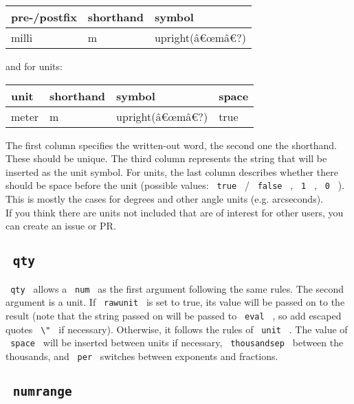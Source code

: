 \begin{longtable}[]{@{}lll@{}}
\toprule\noalign{}
pre-/postfix & shorthand & symbol \\
\midrule\noalign{}
\endhead
\bottomrule\noalign{}
\endlastfoot
milli & m & upright(â€œmâ€?) \\
\end{longtable}

and for units:

\begin{longtable}[]{@{}llll@{}}
\toprule\noalign{}
unit & shorthand & symbol & space \\
\midrule\noalign{}
\endhead
\bottomrule\noalign{}
\endlastfoot
meter & m & upright(â€œmâ€?) & true \\
\end{longtable}

The first column specifies the written-out word, the second one the
shorthand. These should be unique. The third column represents the
string that will be inserted as the unit symbol. For units, the last
column describes whether there should be space before the unit (possible
values: \texttt{\ true\ } / \texttt{\ false\ } , \texttt{\ 1\ } ,
\texttt{\ 0\ } ). This is mostly the cases for degrees and other angle
units (e.g. arcseconds).\\
If you think there are units not included that are of interest for other
users, you can create an issue or PR.

\subsection{\texorpdfstring{\texttt{\ qty\ }}{ qty }}\label{qty}

\texttt{\ qty\ } allows a \texttt{\ num\ } as the first argument
following the same rules. The second argument is a unit. If
\texttt{\ rawunit\ } is set to true, its value will be passed on to the
result (note that the string passed on will be passed to
\texttt{\ eval\ } , so add escaped quotes \texttt{\ \textbackslash{}"\ }
if necessary). Otherwise, it follows the rules of \texttt{\ unit\ } .
The value of \texttt{\ space\ } will be inserted between units if
necessary, \texttt{\ thousandsep\ } between the thousands, and
\texttt{\ per\ } switches between exponents and fractions.

\subsection{\texorpdfstring{\texttt{\ numrange\ }}{ numrange }}\label{numrange}

